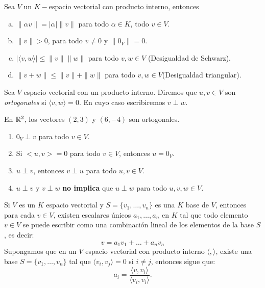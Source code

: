 \begin{thm}
Sea $V$ un $K-$espacio vectorial con producto interno, entonces
\begin{enumerate}[(a)]
    \item $\|\alpha v\|= |\alpha| \|v\|$ para todo $\alpha\in K$, todo $v\in V$.
    \item $\|v\|>0$, para todo $v\neq 0$ y $\|0_V\|=0$.
    \item $|\langle v, w \rangle|\leq \|v\|\|w\|$ para todo $v,w\in V$ (Desigualdad de Schwarz).
    \item $\|v+w\|\leq \|v\|+\|w\|$ para todo $v,w\in V$(Desigualdad triangular).
\end{enumerate}
\end{thm}

\begin{defin}
Sea $V$ espacio vectorial con un producto interno. Diremos que $u,v\in V$ son \emph{ortogonales} si $\langle v, w \rangle=0$. En cuyo caso escribiremos $v\perp w$.
\end{defin}
\begin{ejem}
En $\mathbb{R}^2$, los vectores $(2,3)$ y $(6,-4)$ son ortogonales.
\end{ejem}


\begin{prop}
\begin{enumerate}
    \item $0_V\perp v$ para todo $v\in V$.
    \item Si $<u,v>=0$ para todo $v\in V$, entonces $u=0_V$.
    \item $u\perp v$, entonces $v\perp u$ para todo $u,v\in V$.
    \item $u\perp v$ y $v\perp w$ \textbf{no implica} que $u\perp w$ para todo $u,v,w\in V$.
\end{enumerate}
\end{prop}

Si $V$ es un $K$ espacio vectorial y $S = \{v_1, \dots, v_n\}$ es una $K$ base de $V$, entonces para cada $v \in V$, existen escalares únicos $a_1,\dots, a_n $ en $K $ tal que todo elemento $v \in V$ se puede escribir como una combinación lineal de los elementos de la base $S$, es decir:
\[ v=a_1v_1+\dots+ a_nv_n\]
Supongamos que en un $V$ espacio vectorial con producto interno $\langle , \rangle$, existe una base $S = \{v_1, \dots, v_n\}$ tal que $\langle v_i, v_j \rangle= 0$ si $i \neq j$, entonces sigue que:
\[a_i=\frac{\langle v, v_i \rangle}{\langle v_i, v_i \rangle}.\]

